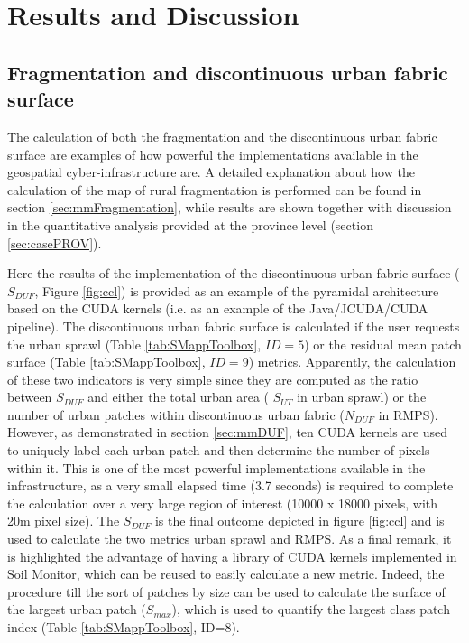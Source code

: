 \documentclass[APA,LATO1COL,doublespace]{WileyNJD-v2}
\begin{document}
\section{ Results and Discussion } %
\label{sec:results}

\subsection{ Fragmentation and discontinuous urban fabric surface }
\label{sec:resFRAG_DUF}
The calculation of both the fragmentation and the discontinuous urban fabric surface are examples of how powerful the implementations available in the geospatial cyber-infrastructure are.
A detailed explanation about how the calculation of the map of rural fragmentation is performed can be found in section \ref{sec:mmFragmentation}, while results are shown
 together with discussion
in the quantitative analysis provided at the province level (section \ref{sec:casePROV}).%

Here the results of the implementation of the discontinuous urban fabric surface ($S_{DUF}$, Figure \ref{fig:ccl}) is provided as an example of the pyramidal architecture based on the CUDA kernels (i.e. as an example of the Java/JCUDA/CUDA pipeline).
The discontinuous urban fabric surface is calculated if the user requests the urban sprawl (Table \ref{tab:SMappToolbox}, $ID = 5$) or the residual mean patch surface (Table \ref{tab:SMappToolbox}, $ID = 9$) metrics.
Apparently, the calculation of these two indicators is very simple since they are computed as the ratio between 
$S_{DUF}$ and either the total urban area ( $S_{UT}$ in urban sprawl) or the number of urban patches within discontinuous urban fabric ($N_{DUF}$ in RMPS).
However, as demonstrated in section \ref{sec:mmDUF}, ten CUDA kernels are used to uniquely label each urban patch and then determine the number of pixels within it.
This is one of the most powerful implementations available in the infrastructure, as a very small elapsed time (3.7 seconds) is required to complete the calculation over a very large region of interest (10000 x 18000 pixels, with 20m pixel size).
The $S_{DUF}$ is the final outcome depicted in figure \ref{fig:ccl} and is used to calculate the two metrics urban sprawl and RMPS.
As a final remark, it is highlighted the advantage of having a library of CUDA kernels implemented in Soil Monitor, which can be reused to easily calculate a new metric.
Indeed, the procedure till the sort of patches by size can be used to calculate the surface of the largest urban patch ($S_{max}$), which is used to quantify the largest class patch index (Table \ref{tab:SMappToolbox}, ID=8).
\end{document}

